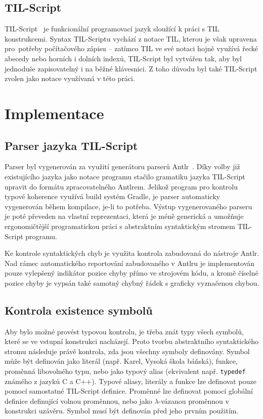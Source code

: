 \documentclass{article}
\begin{document}
\subsection{TIL-Script}

TIL-Script~\cite{til-script} je funkcionální programovací jazyk sloužící k práci s TIL konstrukcemi.
Syntax TIL-Scriptu vychází z notace TIL, kterou je však upravena pro~potřeby počítačového zápisu -- zatímco
TIL ve své notaci hojně využívá řecké abecedy nebo horních i dolních indexů, TIL-Script byl vytvářen
tak, aby byl jednoduše zapisovatelný i na běžné klávesnici. Z toho důvodu byl také TIL-Script zvolen
jako notace využívaná v této práci.

\section{Implementace}

\subsection{Parser jazyka TIL-Script}

Parser byl vygenerován za využití generátoru parserů Antlr~\cite{antlr-src}. Díky volby již existujícího
jazyka jako notace programu stačilo gramatiku jazyka TIL-Script upravit do formátu zpracovatelného
Antlrem. Jelikož program pro kontrolu typové koherence využívá build systém Gradle, je parser automaticky
vygenerován během kompilace, je-li to potřeba. Výstup vygenerovaného parseru je poté převeden na vlastní
reprezentaci, která je méně generická a umožňuje ergonomičtější programatickou práci s abstraktním
syntaktickým stromem TIL-Script programu.

Ke kontrole syntaktických chyb je využita kontrola zabudovaná do nástroje Antlr. Nad rámec automatického
reportování zabudovaného v Antlru je implementován pouze vylepšený indikátor pozice chyby přímo
ve strojovém kódu, a kromě číselné pozice chyby je vypsán také samotný chybný řádek s graficky vyznačenou
chybou.

\subsection{Kontrola existence symbolů}

Aby bylo možné provést typovou kontrolu, je třeba znát typy všech symbolů, které se ve vstupní konstrukci
nacházejí. Proto tvorbu abstraktního syntaktického stromu následuje právě kontrola, zda jsou všechny
symboly definovány. Symbol může být definován jako literál (např. Karel, Vysoká škola báňská), funkce,
proměnná libovolného typu, nebo jako typový alias (ekvivalent např. \texttt{typedef} známého z jazyků
C a C++). Typové aliasy, literály a funkce lze definovat pouze pomocí samostatné TIL-Script definice.
Proměnné lze definovat pomocí globální definice definující volnou proměnnou, nebo jako $\lambda$-vázanou
proměnnou v konstrukci uzávěru. Symbol musí být definován před jeho prvním použitím.
\end{document}
